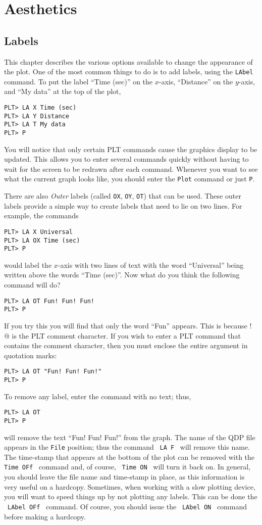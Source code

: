 \chapter{Aesthetics}

\section{Labels}

This chapter describes the various options available to change
the appearance of the plot.
One of the most common things to do is to add labels,
using the {\tt LAbel} command.
To put the label ``Time (sec)'' on the $x$-axis,
``Distance'' on the $y$-axis, and ``My data'' at the top of the plot,
\begin{verbatim}
PLT> LA X Time (sec)
PLT> LA Y Distance
PLT> LA T My data
PLT> P
\end{verbatim}
You will notice that only certain PLT commands
cause the graphics display to be updated.
This allows you to enter several commands quickly
without having to wait for the screen to be redrawn after each command.
Whenever you want to see what the current graph looks like,
you should enter the {\tt Plot} command or just {\tt P}.

There are also {\em Outer} labels
(called {\tt OX}, {\tt OY}, {\tt OT}) that can be used.
These outer labels provide a simple way to create labels
that need to lie on two lines.
For example, the commands
\begin{verbatim}
PLT> LA X Universal
PLT> LA OX Time (sec)
PLT> P
\end{verbatim}
would label the $x$-axis with two lines of text
with the word ``Universal'' being written above the words ``Time (sec)''.
Now what do you think the following command will do?
\begin{verbatim}
PLT> LA OT Fun! Fun! Fun!
PLT> P
\end{verbatim}
If you try this you will find that only the word ``Fun'' appears.
This is because \verb@ ! @ is the PLT comment character.
If you wish to enter a PLT command that contains the comment character,
then you must enclose the entire argument in quotation marks:
\begin{verbatim}
PLT> LA OT "Fun! Fun! Fun!"
PLT> P
\end{verbatim}

To remove any label, enter the command with no text; thus,
\begin{verbatim}
PLT> LA OT
PLT> P
\end{verbatim}
will remove the text ``Fun! Fun! Fun!'' from the graph.
The name of the QDP file appears in the {\tt File} position;
thus the command \, {\tt LA~F} \, will remove this name.
The time-stamp that appears at the bottom of the plot
can be removed with the \, {\tt Time~OFf} \, command
and, of course, \, {\tt Time~ON} \, will turn it back on.
In general, you should leave the file name and time-stamp in place,
as this information is very useful on a hardcopy.
Sometimes, when working with a slow plotting device,
you will want to speed things up by not plotting any labels.
This can be done the \, {\tt LAbel~OFf} \, command.
Of course, you should issue the \, {\tt LAbel~ON} \, command
before making a hardcopy.

